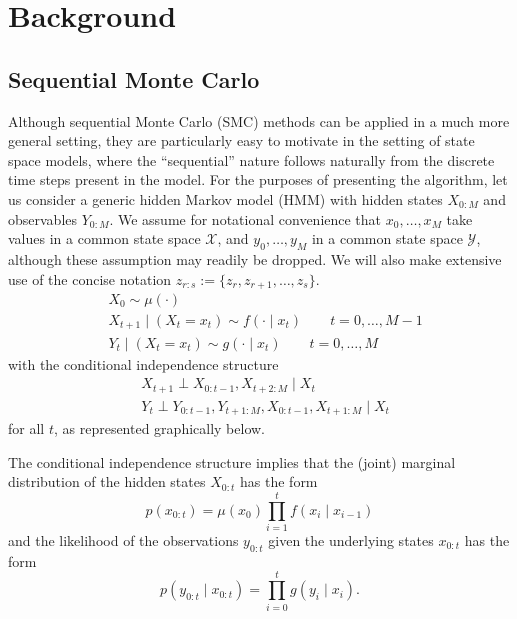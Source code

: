 \documentclass{article}
\begin{document}
\section{Background}
\subsection{Sequential Monte Carlo}\label{sec:smc}
Although sequential Monte Carlo (SMC) methods can be applied in a much more general setting, they are particularly easy to motivate in the setting of state space models, where the ``sequential'' nature follows naturally from the discrete time steps present in the model. 
For the purposes of presenting the algorithm, let us consider a generic hidden Markov model (HMM) with hidden states $X_{0:M}$ and observables $Y_{0:M}$. We assume for notational convenience that $x_0,\dots,x_M$ take values in a common state space $\mathcal{X}$, and $y_0,\dots,y_M$ in a common state space $\mathcal{Y}$, although these assumption may readily be dropped. We will also make extensive use of the concise notation $z_{r:s} := \{z_r, z_{r+1}, \dots, z_s\}$.
\begin{align*}
& X_0 \sim \mu(\cdot) \\
& X_{t+1} \mid (X_t = x_t) \sim f(\cdot \mid x_t)  \qquad t=0,\dots,M-1 \\
& Y_t \mid (X_t = x_t) \sim g(\cdot \mid x_t) \qquad t=0,\dots,M
\end{align*}
with the conditional independence structure
\begin{align*}
& X_{t+1} \perp X_{0:t-1}, X_{t+2:M} \mid X_t \\
& Y_t \perp Y_{0:t-1}, Y_{t+1:M}, X_{0:t-1}, X_{t+1:M} \mid X_t
\end{align*}
for all $t$, as represented graphically below.

\begin{center}
\end{center}

The conditional independence structure implies that the (joint) marginal distribution of the hidden states $X_{0:t}$ has the form
\begin{equation*} \label{eq:hmm_marginal}
p(x_{0:t}) = \mu(x_0) \prod_{i=1}^t f(x_i \mid x_{i-1})
\end{equation*}
and the likelihood of the observations $y_{0:t}$ given the underlying states $x_{0:t}$ has the form
\begin{equation*} \label{eq:hmm_likelihood}
p(y_{0:t} \mid x_{0:t}) = \prod_{i=0}^t g(y_i \mid x_i).
\end{equation*}
\end{document}
